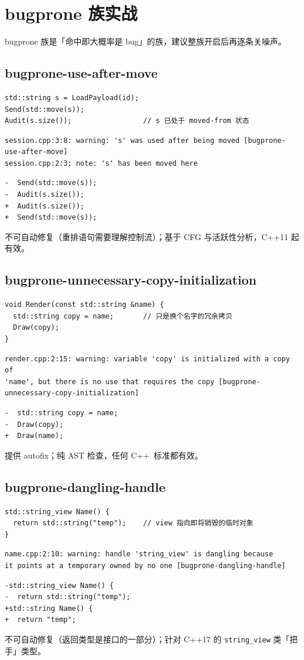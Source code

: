 \documentclass[12pt,a4paper,fontset=fandol]{ctexbook}
\newcommand{\cpp}[1]{C++#1}
\newcommand{\Tp}[1]{\texttt{#1}}
\newcommand{\Lang}[1]{\textsf{#1}}
\newcommand{\CPP}{\Lang{C++}}
\begin{document}
\section{bugprone 族实战}\label{sec:ch13-s1}
bugprone 族是「命中即大概率是 bug」的族，建议整族开启后再逐条关噪声。
\subsection{bugprone-use-after-move}\label{sec:ch13-s1a}
\begin{lstlisting}[style=cppstyle]
std::string s = LoadPayload(id);
Send(std::move(s));
Audit(s.size());                 // s 已处于 moved-from 状态
\end{lstlisting}
\begin{lstlisting}[style=shellstyle]
session.cpp:3:8: warning: 's' was used after being moved [bugprone-use-after-move]
session.cpp:2:3: note: 's' has been moved here
\end{lstlisting}
\begin{lstlisting}[style=diffstyle]
-  Send(std::move(s));
-  Audit(s.size());
+  Audit(s.size());
+  Send(std::move(s));
\end{lstlisting}
不可自动修复（重排语句需要理解控制流）；基于 CFG 与活跃性分析，\cpp{11} 起有效。
\subsection{bugprone-unnecessary-copy-initialization}\label{sec:ch13-s1b}
\begin{lstlisting}[style=cppstyle]
void Render(const std::string &name) {
  std::string copy = name;       // 只是换个名字的冗余拷贝
  Draw(copy);
}
\end{lstlisting}
\begin{lstlisting}[style=shellstyle]
render.cpp:2:15: warning: variable 'copy' is initialized with a copy of
'name', but there is no use that requires the copy [bugprone-unnecessary-copy-initialization]
\end{lstlisting}
\begin{lstlisting}[style=diffstyle]
-  std::string copy = name;
-  Draw(copy);
+  Draw(name);
\end{lstlisting}
提供 autofix；纯 AST 检查，任何 \CPP\ 标准都有效。
\subsection{bugprone-dangling-handle}\label{sec:ch13-s1c}
\begin{lstlisting}[style=cppstyle]
std::string_view Name() {
  return std::string("temp");    // view 指向即将销毁的临时对象
}
\end{lstlisting}
\begin{lstlisting}[style=shellstyle]
name.cpp:2:10: warning: handle 'string_view' is dangling because
it points at a temporary owned by no one [bugprone-dangling-handle]
\end{lstlisting}
\begin{lstlisting}[style=diffstyle]
-std::string_view Name() {
-  return std::string("temp");
+std::string Name() {
+  return "temp";
\end{lstlisting}
不可自动修复（返回类型是接口的一部分）；针对 \cpp{17} 的 \Tp{string\_view} 类「把手」类型。
\end{document}

